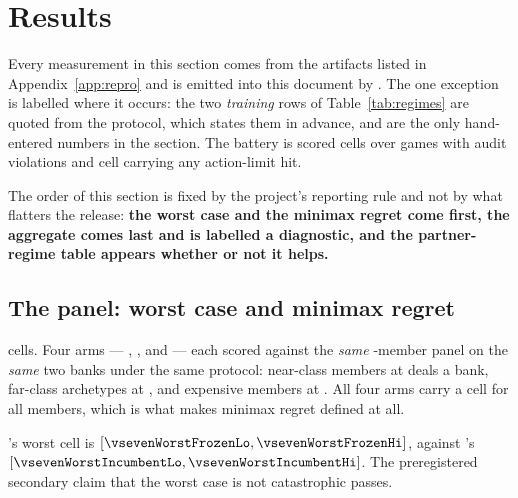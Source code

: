 \section{Results}
\label{sec:results}

Every measurement in this section comes from the artifacts listed in Appendix~\ref{app:repro} and is
emitted into this document by . The one exception is
labelled where it occurs: the two \emph{training} rows of Table~\ref{tab:regimes} are quoted from the
protocol, which states them in advance, and are the only hand-entered numbers in the section. The battery is
\vsevenScoredCells{} scored cells over \vsevenScoredGames{} games with
\vsevenAuditViolations{} audit violations and \vsevenLimitCells{} cell carrying any action-limit hit.

The order of this section is fixed by the project's reporting rule and not by what flatters the
release: \textbf{the worst case and the minimax regret come first, the aggregate comes last and is
labelled a diagnostic, and the partner-regime table appears whether or not it helps.}

\subsection{The panel: worst case and minimax regret}
\label{sec:results-panel}

\vsevenPanelCells{} cells. Four arms --- \frozen{}, \incumbent{}, \fcheap{} and \composite{} --- each
scored against the \emph{same} \vsevenPanelMembers{}-member panel on the \emph{same} two banks under
the same protocol: \vsevenPanelNear{} near-class members at \vsevenDealsNear{} deals a bank,
\vsevenPanelFar{} far-class archetypes at \vsevenDealsFar{}, and \vsevenPanelExpensive{} expensive
members at \vsevenDealsExpensive{}. All four arms carry a cell for all \vsevenPanelMembers{} members, which is what makes minimax
regret defined at all.

\begin{table}[t]\centering
\caption{Worst cell per arm over the shared panel. This is the headline and it is printed first.}
\label{tab:worstcase}
{\small}
\end{table}

\frozen{}'s worst cell is \vsevenWorstFrozen{}
$[\vsevenWorstFrozenLo, \vsevenWorstFrozenHi]$, against \incumbent{}'s \vsevenWorstIncumbent{}
$[\vsevenWorstIncumbentLo, \vsevenWorstIncumbentHi]$. The preregistered secondary claim that the worst
case is not catastrophic passes.

